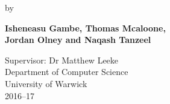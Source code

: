 \begin{spacing}{2}
	\begin{center}
		by \vspace{7mm}
		\begin{spacing}{1}
			\textbf{Isheneasu Gambe, Thomas Mcaloone,\\ Jordan Olney and Naqash Tanzeel}
		\end{spacing}
	\end{center}
	\vspace{20mm}
	\begin{center}
		{ Supervisor: Dr Matthew Leeke}\vspace{7mm}
		\\ {\large Department of Computer Science}
		\\ {\large University of Warwick}
		\\ {\large 2016--17}
	\end{center}
\end{spacing}


